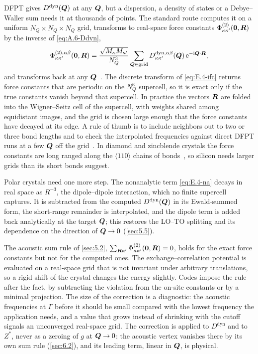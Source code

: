 DFPT gives $D^{\mathrm{dyn}}(\bm{Q})$ at any $\bm{Q}$, but a dispersion, a density of states or a Debye--Waller sum needs it at thousands of points. The standard route computes it on a uniform $N_Q\times N_Q\times N_Q$ grid, transforms to real-space force constants $\Phi^{(2)}_{\kappa\kappa'}(\bm{0},\bm{R})$ by the inverse of \cref{eq:A.6-Ddyn},
\begin{equation}
  \Phi^{(2),\alpha\beta}_{\kappa\kappa'}(\bm{0},\bm{R}) = \frac{\sqrt{M_\kappa M_{\kappa'}}}{N_Q^3}\sum_{\bm{Q}\in\mathrm{grid}} D^{\mathrm{dyn},\alpha\beta}_{\kappa\kappa'}(\bm{Q})\,\mathrm{e}^{-\mathrm{i}\bm{Q}\cdot\bm{R}} ,
  \label{eq:E.4-ifc}
\end{equation}
and transforms back at any $\bm{Q}$~\cite[Eq.~(99)]{baroni2001phonons}. The discrete transform of \cref{eq:E.4-ifc} returns force constants that are periodic on the $N_Q^3$ supercell, so it is exact only if the true constants vanish beyond that supercell. In practice the vectors $\bm{R}$ are folded into the Wigner--Seitz cell of the supercell, with weights shared among equidistant images, and the grid is chosen large enough that the force constants have decayed at its edge. A rule of thumb is to include neighbors out to two or three bond lengths and to check the interpolated frequencies against direct DFPT runs at a few $\bm{Q}$ off the grid~\cite[Sect.~II.D.3]{baroni2001phonons}. In diamond and zincblende crystals the force constants are long ranged along the $\langle 110\rangle$ chains of bonds~\cite[Sect.~V.A.1]{baroni2001phonons}, so silicon needs larger grids than its short bonds suggest.

Polar crystals need one more step. The nonanalytic term \cref{eq:E.4-na} decays in real space as $R^{-3}$, the dipole--dipole interaction, which no finite supercell captures. It is subtracted from the computed $D^{\mathrm{dyn}}(\bm{Q})$ in its Ewald-summed form, the short-range remainder is interpolated, and the dipole term is added back analytically at the target $\bm{Q}$; this restores the LO--TO splitting and its dependence on the direction of $\bm{Q}\to 0$ (\cref{sec:5.5}).

The acoustic sum rule of \cref{sec:5.2}, $\sum_{\bm{R}\kappa'}\Phi^{(2)}_{\kappa\kappa'}(\bm{0},\bm{R}) = 0$, holds for the exact force constants but not for the computed ones. The exchange--correlation potential is evaluated on a real-space grid that is not invariant under arbitrary translations, so a rigid shift of the crystal changes the energy slightly. Codes impose the rule after the fact, by subtracting the violation from the on-site constants or by a minimal projection. The size of the correction is a diagnostic: the acoustic frequencies at $\Gamma$ before it should be small compared with the lowest frequency the application needs, and a value that grows instead of shrinking with the cutoff signals an unconverged real-space grid. The correction is applied to $D^{\mathrm{dyn}}$ and to $Z^*$, never as a zeroing of $g$ at $\bm{Q}\to 0$: the acoustic vertex vanishes there by its own sum rule (\cref{sec:6.2}), and its leading term, linear in $\bm{Q}$, is physical.

